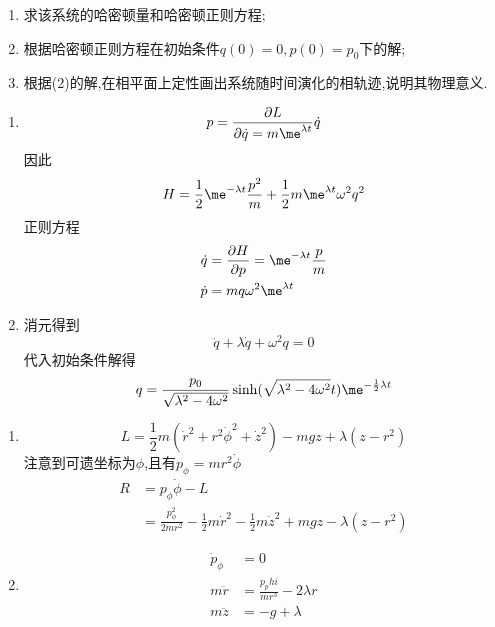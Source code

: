 \begin{enumerate}[label=(\arabic*)]
    \item 求该系统的哈密顿量和哈密顿正则方程;
    \item 根据哈密顿正则方程在初始条件$q(0)=0,p(0)=p_0$下的解;
    \item 根据(2)的解,在相平面上定性画出系统随时间演化的相轨迹,说明其物理意义.
\end{enumerate}
\begin{solution}
    \begin{enumerate}[label=(\arabic*)]
        \item 
        $$p=\frac{\partial L}{\partial \dot q=m\me^{\lambda t}}\dot q$$
        因此
        $$H=\frac12\me^{-\lambda t}\frac{p^2}{m}+\frac12 m\me^{\lambda t}\omega^2q^2$$
        正则方程
        \begin{align*}
            \dot q&=\frac{\partial H}{\partial p}=\me^{-\lambda t}\frac{p}{m}\\
            \dot p&=mq\omega^2\me^{\lambda t}
        \end{align*}
        \item 消元得到
        $$\ddot q+\lambda \dot q+\omega^2 q=0$$
        代入初始条件解得
        $$q=\frac{p_0}{\sqrt{\lambda^2-4\omega^2}}\sinh({\sqrt{\lambda^2-4\omega^2}t})\me^{-\frac12\lambda t}$$
    \end{enumerate}
\end{solution}
\begin{solution}
    \begin{enumerate}[label=(\arabic*)]
        \item 
        $$L=\frac12m(\dot r^2+r^2\dot\phi^2+\dot z^2)-mgz+\lambda(z-r^2)$$
        注意到可遗坐标为$\phi$,且有$p_\phi=mr^2\dot\phi$
        \begin{align*}
            R&=p_\phi\dot\phi-L\\
             &=\frac{p_\phi^2}{2mr^2}-\frac12m\dot r^2-\frac12m\dot z^2+mgz-\lambda(z-r^2)
        \end{align*}
        \item 
        \begin{align*}
            \dot p_\phi&=0\\
            m\ddot r&=\frac{p_phi}{mr^3}-2\lambda r\\
            m\ddot z&=-g+\lambda
        \end{align*}
    \end{enumerate}
\end{solution}
